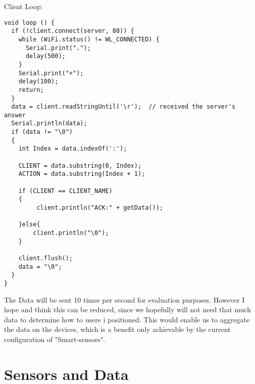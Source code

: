 Client Loop:

\begin{lstlisting}
void loop () {
  if (!client.connect(server, 80)) {
    while (WiFi.status() != WL_CONNECTED) {
      Serial.print(".");
      delay(500);
    }
    Serial.print("+");
    delay(100);
    return;
  }
  data = client.readStringUntil('\r');  // received the server's answer
  Serial.println(data);
  if (data != "\0")
  {
    int Index = data.indexOf(':');

    CLIENT = data.substring(0, Index);
    ACTION = data.substring(Index + 1);

    if (CLIENT == CLIENT_NAME)
    {
         client.println("ACK:" + getData());
      
    }else{
        client.println("\0");
    }

    client.flush();
    data = "\0";
  }
}
\end{lstlisting}

The Data will be sent 10 times per second for evaluation purposes. 
However I hope and think this can be reduced, since we hopefully will not need that much data to determine how to usere i positioned. This would enable us to aggregate the data on the devices, which is a benefit only achievable by the current configuration of "Smart-sensors".

\section{Sensors and Data}


